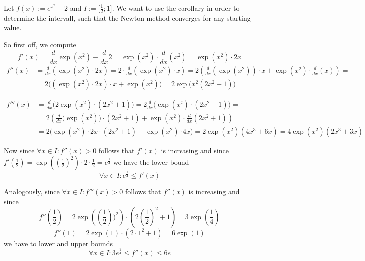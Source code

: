\begin{example}
   Let \(f(x) := e^{x^2} - 2\) and \(I := \big[\frac{1}{2}; 1\big]\).
   We want to use the corollary in order to determine the intervall, such that the Newton method converges for any starting value.

   So first off, we compute
   \[f'(x) = \frac{d}{dx} \exp(x^2) - \frac{d}{dx} 2 = \exp(x^2) \cdot \frac{d}{dx}(x^2) = \exp(x^2) \cdot 2x\]
   \begin{equation*}
      \begin{split}
         f''(x) & = \frac{d}{dx}(\exp(x^2) \cdot 2x) = 2 \cdot \frac{d}{dx} (\exp(x^2) \cdot x) = 2 \left(\frac{d}{dx} (\exp(x^2)) \cdot x + \exp(x^2) \cdot \frac{d}{dx}(x)\right) = \\
                & = 2\big((\exp(x^2) \cdot 2x) \cdot x + \exp(x^2)\big) = 2\exp\big(x^2(2x^2 + 1)\big)
      \end{split}
   \end{equation*}

   \begin{equation*}
      \begin{split}
         f'''(x) & = \frac{d}{dx} \big(2\exp(x^2) \cdot (2x^2 + 1)\big) = 2 \frac{d}{dx}\big(\exp(x^2)\cdot (2x^2 + 1)\big) = \\
                 & = 2 \left(\frac{d}{dx}\big(\exp(x^2)\big)\cdot(2x^2 + 1) + \exp(x^2) \cdot \frac{d}{dx}(2x^2 + 1)\right) = \\
                 & = 2\big(\exp(x^2) \cdot 2x \cdot (2x^2 + 1) + \exp(x^2) \cdot 4x\big) = 2 \exp(x^2)(4x^3 + 6x) = 4\exp(x^2)(2x^3 + 3x)
      \end{split}
   \end{equation*}

   Now since \(\forall x \in I: f''(x) > 0\) follows that \(f'(x)\) is increasing and since \(f'\left(\frac{1}{2}\right) = \exp\left(\left(\frac{1}{2}\right)^2\right)\cdot 2 \cdot \frac{1}{2} = e^{\frac{1}{4}}\)
   we have the lower bound
   \[\forall x \in I: e^{\frac{1}{4}} \leq f'(x)\]

   Analogously, since \(\forall x \in I: f'''(x) > 0\) follows that \(f''(x)\) is increasing and since
   \[f''\left(\frac{1}{2}\right) = 2 \exp\left(\left(\frac{1}{2}\right))^2\right) \cdot \left(2 \left(\frac{1}{2}\right)^2 + 1\right) = 3 \exp\left(\frac{1}{4}\right)\]
   \[f''(1) = 2 \exp(1) \cdot (2 \cdot 1^2 + 1) = 6 \exp(1)\]
   we have to lower and upper bounds
   \[\forall x \in I: 3e^{\frac{1}{4}} \leq f''(x) \leq 6e\]


\end{example}
